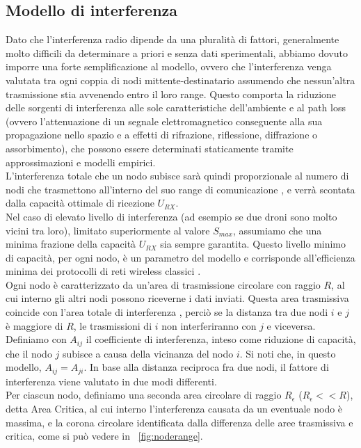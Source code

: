 \subsection{Modello di interferenza}
Dato che l'interferenza radio dipende da una pluralità di fattori, generalmente molto difficili da determinare a priori e senza dati sperimentali, abbiamo dovuto imporre una forte semplificazione al modello, ovvero che l'interferenza venga valutata tra ogni coppia di nodi mittente-destinatario assumendo che nessun'altra trasmissione stia avvenendo entro il loro range. Questo comporta la riduzione delle sorgenti di interferenza alle sole caratteristiche dell'ambiente e al path loss \cite{Killat:2009:EMP:1554307.1554311} (ovvero l'attenuazione di un segnale elettromagnetico conseguente alla sua propagazione nello spazio e a effetti di rifrazione, riflessione, diffrazione o assorbimento), che possono essere determinati staticamente tramite approssimazioni e modelli empirici. \\
L'interferenza totale che un nodo subisce sarà quindi proporzionale al numero di nodi che trasmettono all'interno del suo range di comunicazione \cite{moaveni2005low, 7377438}, e verrà scontata dalla capacità ottimale di ricezione $U_{RX}$. \\
Nel caso di elevato livello di interferenza (ad esempio se due droni sono molto vicini tra loro), limitato superiormente al valore $S_{max}$, assumiamo che una minima frazione della capacità $U_{RX}$ sia sempre garantita. Questo livello minimo di capacità, per ogni nodo, è un parametro del modello e corrisponde all'efficienza minima dei protocolli di reti wireless classici \cite{tanenbaum2003computer}. \\
Ogni nodo è caratterizzato da un'area di trasmissione circolare con raggio $R$, al cui interno gli altri nodi possono riceverne i dati inviati. Questa area trasmissiva coincide con l'area totale di interferenza \cite{6547140}, perciò se la distanza tra due nodi $i$ e $j$ è maggiore di $R$, le trasmissioni di $i$ non interferiranno con $j$ e viceversa.  \\
Definiamo con $A_{ij}$ il coefficiente di interferenza, inteso come riduzione di capacità, che il nodo $j$ subisce a causa della vicinanza del nodo $i$. Si noti che, in questo modello, $A_{ij} = A_{ji}$.
In base alla distanza reciproca fra due nodi, il fattore di interferenza viene valutato in due modi differenti. \\
Per ciascun nodo, definiamo una seconda area circolare di raggio $R_\epsilon$ ($R_\epsilon << R$), detta Area Critica, al cui interno l'interferenza causata da un eventuale nodo è massima, e la corona circolare identificata dalla differenza delle aree trasmissiva e critica, come si può vedere in \figurename\ \ref{fig:noderange}. \\
